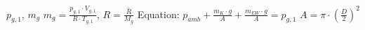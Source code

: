 \( p_{g,1} \), \( m_g \)  
\( m_g = \frac{p_{g,1} \cdot V_{g,1}}{R \cdot T_{g,1}} \), \( R = \frac{\bar{R}}{M_g} \)  
Equation: \( p_{amb} + \frac{m_K \cdot g}{A} + \frac{m_{EW} \cdot g}{A} = p_{g,1} \)  
\( A = \pi \cdot \left(\frac{D}{2}\right)^2 \)
